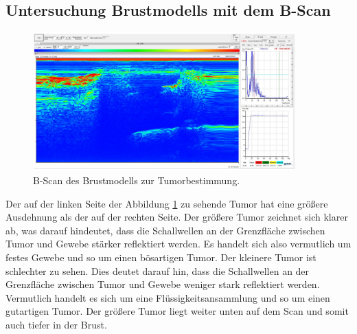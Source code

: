 \subsection{Untersuchung Brustmodells mit dem B-Scan}
\label{sec:BScanBrust}

\begin{figure}
    \centering
    \includegraphics[width=0.9\textwidth]{img/BrustB-Scan.png}
    \caption{B-Scan des Brustmodells zur Tumorbestimmung.}
    \label{fig:BScanBrust}
\end{figure}

Der auf der linken Seite der Abbildung \ref{fig:BScanBrust} zu sehende Tumor hat eine größere Ausdehnung als der auf der rechten Seite.
Der größere Tumor zeichnet sich klarer ab, was darauf hindeutet, dass die Schallwellen an der Grenzfläche zwischen Tumor und Gewebe stärker reflektiert werden.
Es handelt sich also vermutlich um festes Gewebe und so um einen bösartigen Tumor.
Der kleinere Tumor ist schlechter zu sehen. Dies deutet darauf hin, dass die Schallwellen an der Grenzfläche zwischen Tumor und Gewebe weniger stark reflektiert werden.
Vermutlich handelt es sich um eine Flüssigkeitsansammlung und so um einen gutartigen Tumor.
Der größere Tumor liegt weiter unten auf dem Scan und somit auch tiefer in der Brust.